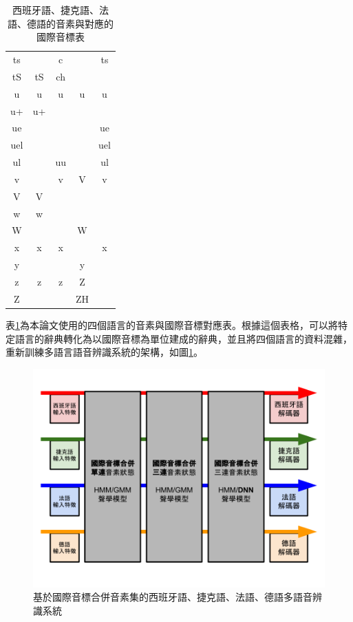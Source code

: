 \begin{table}
\begin{tabular}{|c|cccc|}
  ts  &     &  c  &     &  ts \\
  tS  &  tS & ch  &     &     \\
  u   &  u  &  u  & u   &   u \\
  u+  &  u+ &     &     &     \\
  ue  &     &     &     &  ue \\
  uel &     &     &     & uel \\
  ul  &     & uu  &     &  ul \\
  v   &     &  v  & V   &   v \\
  V   &  V  &     &     &     \\
  w   &  w  &     &     &     \\
  W   &     &     & W   &     \\
  x   &  x  &  x  &     &   x \\
  y   &     &     & y   &     \\
  z   &  z  &  z  & Z   &     \\
  Z   &     &     & ZH  &     \\
\hline
\end{tabular}
\caption{西班牙語、捷克語、法語、德語的音素與對應的國際音標表}
\label{table:GP_IPA_mapping}
\end{table}

表\ref{table:GP_IPA_mapping}為本論文使用的四個語言的音素與國際音標對應表。根據這個表格，可以將特定語言的辭典轉化為以國際音標為單位建成的辭典，並且將四個語言的資料混雜，重新訓練多語言語音辨識系統的架構，如圖\ref{fig:chap4_IPA_merged}。

\begin{figure}[!h]
\centering
\includegraphics[scale=0.4]{images/chap4_IPA_merged.png}
\caption{基於國際音標合併音素集的西班牙語、捷克語、法語、德語多語音辨識系統}
\label{fig:chap4_IPA_merged}
\end{figure}

